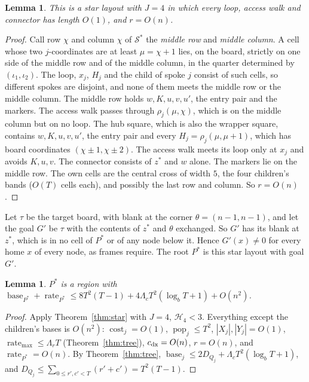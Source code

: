 \documentclass[11pt]{amsart}
\newtheorem{lemma}[theorem]{Lemma}
\theoremstyle{definition}
\newcommand{\pop}{\operatorname{pop}}
\newcommand{\base}{\operatorname{base}}
\newcommand{\rate}{\operatorname{rate}}
\newcommand{\cost}{\operatorname{cost}}
\begin{document}
\begin{lemma}\label{lem:rootlayout}
This is a star layout with $J=4$ in which every loop, access walk and connector has length $O(1)$, and
$r=O(n)$.
\end{lemma}

\begin{proof}
Call row $\chi$ and column $\chi$ of $\mathcal S^*$ the \emph{middle row} and \emph{middle column}. A cell whose two $j$-coordinates are at least $\mu=\chi+1$ lies, on the board, strictly on one side of the middle
row and of the middle column, in the quarter determined by $(\iota_1,\iota_2)$. The loop, $x_j$, $H_j$ and the child of spoke $j$
consist of such cells, so different spokes are disjoint, and none of them meets the middle row or the middle column. The
middle row holds $w,K,u,v,u'$, the entry pair and the markers. The access walk passes through $\rho_j(\mu,\chi)$, which is on the
middle column but on no loop. The hub square, which is also the wrapper square, contains $w,K,u,v,u'$, the entry pair and every $H_j=\rho_j(\mu,\mu+1)$, which has
board coordinates $(\chi\pm1,\chi\pm2)$. The access walk meets its loop only at $x_j$ and avoids $K,u,v$. The connector consists of
$z^*$ and $w$ alone. The markers lie on the middle row. The own cells are the central cross of
width $5$, the four children's bands ($O(T)$ cells each), and possibly the last row and column. So $r=O(n)$.
\end{proof}

Let $\tau$ be the target board, with blank at the corner $\theta=(n-1,n-1)$, and let the goal
$G'$ be $\tau$ with the contents of $z^*$ and $\theta$ exchanged. So $G'$ has its blank at $z^*$, which is in
no cell of $P^*$ or of any node below it. Hence $G'(x)\ne0$ for every home $x$ of every node, as frames require. The root $P^*$ is this star layout with goal $G'$.

\begin{lemma}\label{lem:rootbudget}
$P^*$ is a region with $\base_{P^*}+\rate_{P^*}\le 8T^2(T-1)+4\Lambda_cT^2(\log_bT+1)+O(n^2)$.
\end{lemma}

\begin{proof}
Apply Theorem~\ref{thm:star} with $J=4$, $\mathcal H_4<3$. Everything except the children's bases is $O(n^2)$:
$\cost_j=O(1)$, $\pop_j\le T^2$, $|X_j|,|Y_j|=O(1)$, $\rate_{\max}\le \Lambda_rT$ (Theorem~\ref{thm:tree}),
$c_{\rm dx}=O(n)$, $r=O(n)$, and $\rate_{P^*}=O(n)$. By Theorem~\ref{thm:tree}, $\base_j\le2D_{Q_j}+\Lambda_cT^2(\log_bT+1)$,
and $D_{Q_j}\le\sum_{0\le r',c'<T}(r'+c')=T^2(T-1)$.
\end{proof}
\end{document}
